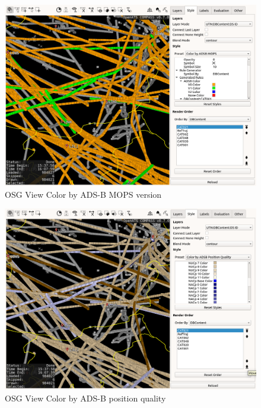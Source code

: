 \begin{figure}[H]
    \hspace*{-2.5cm}
    \includegraphics[width=19cm,frame]{figures/osgview_style_adsb_mops.png}
  \caption{OSG View Color by ADS-B MOPS version}
\end{figure}

\begin{figure}[H]
    \hspace*{-2.5cm}
    \includegraphics[width=19cm,frame]{figures/osgview_style_adsb_position_qual.png}
  \caption{OSG View Color by ADS-B position quality}
\end{figure}

